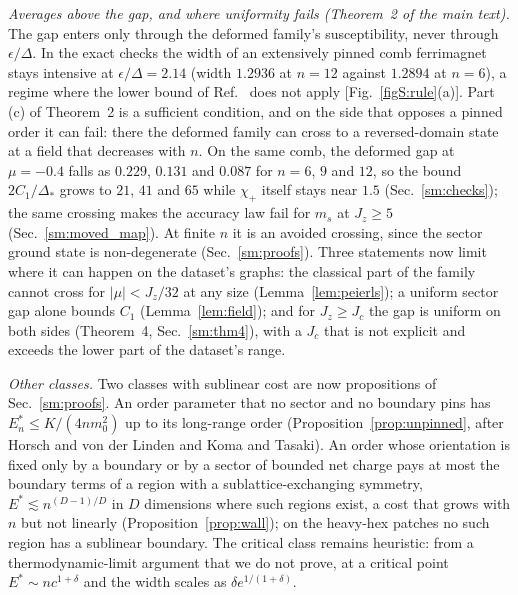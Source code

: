 \documentclass[aps,prx,onecolumn,10pt,nofootinbib,longbibliography,floatfix]{revtex4-2}
\theoremstyle{remark}
\newcommand{\Jz}{J_z}
\newcommand{\ms}{m_s}
\newcommand{\de}{\delta e}
\begin{document}
\emph{Averages above the gap, and where uniformity fails (Theorem~2 of the main text).} The gap enters only through %
the deformed family's susceptibility, never through $\epsilon/\Delta$. In the exact checks the width of an
extensively pinned comb ferrimagnet stays intensive at $\epsilon/\Delta=2.14$ (width $1.2936$ at $n=12$ against %
$1.2894$ at $n=6$), a regime where the lower bound of Ref.~\cite{manchanda2026} does not apply %
[Fig.~\ref{figS:rule}(a)]. Part (c) of Theorem~2 is a sufficient condition, and on the side that opposes a pinned %
order it can fail: there the deformed family can cross to a reversed-domain state at a field that decreases with
$n$. On the same comb, the deformed gap at $\mu=-0.4$ falls as $0.229$, $0.131$ and $0.087$ for $n=6$, $9$ and $12$, %
so the bound $2C_1/\Delta_*$ grows to $21$, $41$ and $65$ while $\chi_+$ itself stays near $1.5$ %
(Sec.~\ref{sm:checks}); the same crossing makes the accuracy law fail for $\ms$ at $\Jz\ge5$ (Sec.~\ref{sm:moved_map}).
At finite $n$ it is an avoided crossing, since the sector ground state is non-degenerate (Sec.~\ref{sm:proofs}).
Three statements now limit where it can happen on the dataset's graphs: the classical part of the family cannot
cross for $|\mu|<\Jz/32$ at any size (Lemma~\ref{lem:peierls}); a uniform sector gap alone bounds $C_1$ %
(Lemma~\ref{lem:field}); and for $\Jz\ge J_c$ the gap is uniform on both sides (Theorem~4, Sec.~\ref{sm:thm4}), with %
a $J_c$ that is not explicit and exceeds the lower part of the dataset's range.

\emph{Other classes.} Two classes with sublinear cost are now propositions of Sec.~\ref{sm:proofs}. An order
parameter that no sector and no boundary pins has $E^*_n\le K/(4nm_0^2)$ up to its long-range order
(Proposition~\ref{prop:unpinned}, after Horsch and von der Linden and Koma and Tasaki). An order whose orientation
is fixed only by a boundary or by a sector of bounded net charge pays at most the boundary terms of a region with a
sublattice-exchanging symmetry, $E^*\lesssim n^{(D-1)/D}$ in $D$ dimensions where such regions exist, a cost that
grows with $n$ but not linearly (Proposition~\ref{prop:wall}); on the heavy-hex patches no such region has a
sublinear boundary. The critical class remains heuristic: from a thermodynamic-limit argument that we do not prove,
at a critical point $E^*\sim nc^{1+\delta}$ and the width scales as $\de^{1/(1+\delta)}$.
\end{document}
